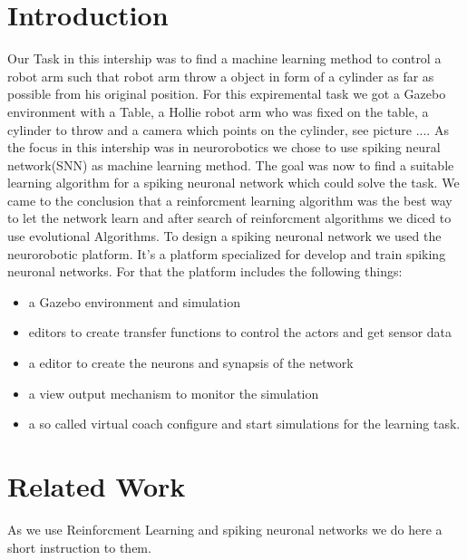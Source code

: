 \section{Introduction}
Our Task in this intership was to find a machine learning method to control a robot arm such that robot arm throw a object in form of a cylinder as far as possible from his original position. For this expiremental task we got a Gazebo environment with a Table, a Hollie robot arm who was fixed on the table, a cylinder to throw and a camera which points on the cylinder, see picture .... 
As the focus in this intership was in neurorobotics we chose to use spiking neural network(SNN) as machine learning method. The goal was now to find a suitable learning algorithm for a spiking neuronal network which could solve the task. We came to the conclusion that a reinforcment learning algorithm was the best way to let the network learn and after search of reinforcment algorithms we diced to use evolutional Algorithms. 
To design a spiking neuronal network we used the neurorobotic platform. It's a platform specialized for develop and train spiking neuronal networks. For that the platform includes the following things:
 \begin{itemize}
\item a Gazebo environment and simulation
\item editors to create transfer functions to control the actors and get sensor data
\item a editor to create the neurons and synapsis of the network
\item a view output mechanism to monitor the simulation
\item a so called virtual coach configure and start simulations for the learning task.
\end{itemize} 

\section{Related Work}
As we use Reinforcment Learning and spiking neuronal networks we do here a short instruction to them.
